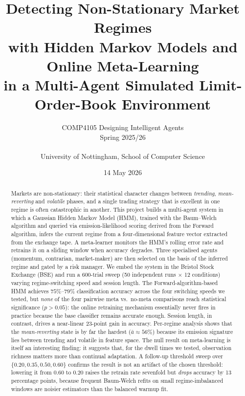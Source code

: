 \documentclass[11pt,a4paper]{article}
\title{\vspace{-1.2cm}\textbf{Detecting Non-Stationary Market Regimes\\
with Hidden Markov Models and Online Meta-Learning}\\
\large in a Multi-Agent Simulated Limit-Order-Book Environment}
\author{COMP4105 Designing Intelligent Agents \\ Spring 2025/26 \\ \\
\small University of Nottingham, School of Computer Science}
\date{14 May 2026}
\begin{document}
\maketitle
\vspace{-0.6cm}

\begin{abstract}
\noindent
Markets are non-stationary: their statistical character changes between
\emph{trending}, \emph{mean-reverting} and \emph{volatile} phases, and a single
trading strategy that is excellent in one regime is often catastrophic in
another. This project builds a multi-agent system in which a Gaussian Hidden
Markov Model (HMM), trained with the Baum--Welch algorithm and queried via
emission-likelihood scoring derived from the Forward algorithm, infers the
current regime from a four-dimensional feature vector extracted from the
exchange tape. A meta-learner monitors the HMM's rolling error rate and
retrains it on a sliding window when accuracy degrades. Three specialised
agents (momentum, contrarian, market-maker) are then selected on the basis of
the inferred regime and gated by a risk manager. We embed the system in the
Bristol Stock Exchange (BSE) and run a 600-trial sweep (50 independent runs
$\times$ 12 conditions) varying regime-switching speed and session length.
The Forward-algorithm-based HMM achieves $75\%$--$79\%$ classification accuracy
across the four switching speeds we tested, but \emph{none} of the four
pairwise meta vs.\ no-meta comparisons reach statistical significance
($p > 0.05$): the online retraining mechanism essentially never fires in
practice because the base classifier remains accurate enough. Session length,
in contrast, drives a near-linear $23$-point gain in accuracy. Per-regime
analysis shows that the \emph{mean-reverting} state is by far the hardest
($\bar{a}\!\approx\!56\%$) because its emission signature lies between
trending and volatile in feature space. The null result on meta-learning is
itself an interesting finding: it suggests that, for the dwell times we
tested, observation richness matters more than continual adaptation.
A follow-up threshold sweep over $\{0.20, 0.35, 0.50, 0.60\}$ confirms the
result is not an artifact of the chosen threshold: lowering it from $0.60$
to $0.20$ raises the retrain rate sevenfold but \emph{drops} accuracy by
13 percentage points, because frequent Baum-Welch refits on small
regime-imbalanced windows are noisier estimators than the balanced warmup
fit.
\end{abstract}

\vspace{-0.2cm}
\end{document}
